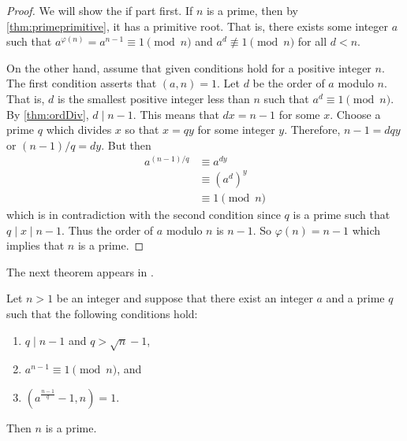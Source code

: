\documentclass{subfiles}
\begin{document}
		\begin{proof}
			We will show the if part first. If $n$ is a prime, then by \autoref{thm:primeprimitive}, it has a primitive root. That is, there exists some integer $a$ such that $a^{\varphi(n)} = a^{n-1} \equiv 1 \pmod n$ and $a^d \not \equiv 1 \pmod n$ for all $d<n$.

			On the other hand, assume that given conditions hold for a positive integer $n$. The first condition asserts that $(a,n)=1$. Let $d$ be the order of $a$ modulo $n$. That is, $d$ is the smallest positive integer less than $n$ such that $a^d \equiv 1 \pmod n$. By \autoref{thm:ordDiv}, $d\mid n-1$. This means that $dx = n-1$ for some $x$. Choose a prime $q$ which divides $x$ so that $x=qy$ for some integer $y$. Therefore, $n-1=dqy$ or $(n-1)/q=dy$. But then
				\begin{align*}
					a^{(n-1)/q}
						& \equiv a^{dy}\\
						& \equiv \left(a^d\right)^y\\
						& \equiv 1 \pmod n
				\end{align*}
			which is in contradiction with the second condition since $q$ is a prime such that $q\mid x\mid n-1$. Thus the order of $a$ modulo $n$ is $n-1$. So $\varphi(n)=n-1$ which implies that $n$ is a prime.
		\end{proof}
	The next theorem appears in \textcite[Chapter $\S$VI, section $6.3$, proposition $6.3.1$, Page $187$]{koblitz_2012}.
		\begin{theorem}
			Let $n>1$ be an integer and suppose that there exist an integer $a$ and a prime $q$ such that the following conditions hold:
				\begin{enumerate}
					\item $q\mid n-1$ and $q > \sqrt n -1$,
					\item $a^{n-1} \equiv1\pmod n$, and
					\item $\left(a^{\frac{n-1}{q}}-1,n\right) = 1$.
				\end{enumerate}
			Then $n$ is a prime.
		\end{theorem}
\end{document}
